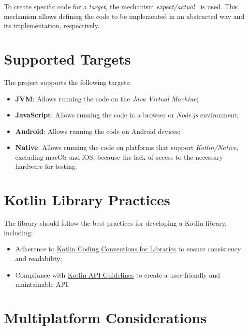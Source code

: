 To create specific code for a \textit{target}, the mechanism \textit{expect/actual}~\cite{kmp-expect-actual} is used.
This mechanism allows defining the code to be implemented in an abstracted way and its implementation, respectively.


\section{Supported Targets}\label{sec:supported-targets}

The project supports the following targets:

\begin{itemize}
    \item \textbf{JVM}: Allows running the code on the \textit{Java Virtual Machine};
    \item \textbf{JavaScript}: Allows running the code in a browser or \textit{Node.js} environment;
    \item \textbf{Android}: Allows running the code on Android devices;
    \item \textbf{Native}: Allows running the code on platforms that support \textit{Kotlin/Native}, excluding macOS and iOS, because the lack of access to the necessary hardware for testing.
\end{itemize}


\section{Kotlin Library Practices}\label{sec:kotlin-library-practices}

The library should follow the best practices for developing a Kotlin library, including:

\begin{itemize}
    \item Adherence to \href{https://kotlinlang.org/docs/coding-conventions.html#coding-conventions-for-libraries}{Kotlin Coding Conventions for Libraries} to ensure consistency and readability;
    \item Compliance with \href{https://kotlinlang.org/docs/api-guidelines-introduction.html}{Kotlin API Guidelines} to create a user-friendly and maintainable API.
\end{itemize}


\section{Multiplatform Considerations}\label{sec:multiplatform-considerations}

